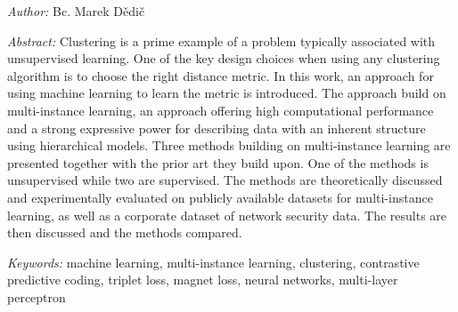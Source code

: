 \bigskip

\noindent \textit{Author:} Bc. Marek Dědič

\bigskip

\noindent \textit{Abstract:}
Clustering is a prime example of a problem typically associated with unsupervised learning. One of the key design choices when using any clustering algorithm is to choose the right distance metric. In this work, an approach for using machine learning to learn the metric is introduced. The approach build on multi-instance learning, an approach offering high computational performance and a strong expressive power for describing data with an inherent structure using hierarchical models. Three methods building on multi-instance learning are presented together with the prior art they build upon. One of the methods is unsupervised while two are supervised. The methods are theoretically discussed and experimentally evaluated on publicly available datasets for multi-instance learning, as well as a corporate dataset of network security data. The results are then discussed and the methods compared.

\bigskip

\noindent \textit{Keywords:}
machine learning, multi-instance learning, clustering, contrastive predictive coding, triplet loss, magnet loss, neural networks, multi-layer perceptron
